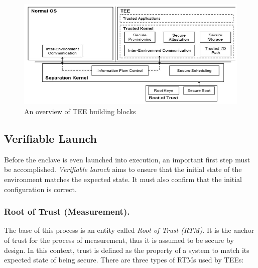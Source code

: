 \documentclass[runningheads,a4paper]{uwsese}
\begin{document}
\begin{figure}[h]
    \centering
    \includegraphics[scale=.6]{tee_components.png}
    \caption{An overview of TEE building blocks \cite{tee_is_and_not}}
    \label{fig:tee_components}
\end{figure}

\subsection{Verifiable Launch}

Before the enclave is even launched into execution, an important first step
must be accomplished. \emph{Verifiable launch} aims to ensure that the initial
state of the environment matches the expected state. It must also confirm that
the initial configuration is correct. 

\subsubsection{Root of Trust (Measurement).}
\label{rot}

The base of this process is an entity called \emph{Root of Trust (RTM)}. It is
the anchor of trust for the process of measurement, thus it is assumed to be
secure by design. In this context, trust is defined as the property of a system
to match its expected state of being secure. There are three types of RTMs used
by TEEs:
\end{document}
